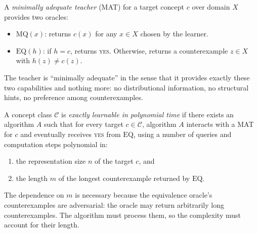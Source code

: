 \begin{defn}
\label{def:mat}
A \emph{minimally adequate teacher} (MAT) for a target concept $c$ over domain $X$ provides two oracles:
\begin{itemize}[leftmargin=*, itemsep=2pt]
\item $\mathrm{MQ}(x)$: returns $c(x)$ for any $x \in X$ chosen by the learner.
\item $\mathrm{EQ}(h)$: if $h = c$, returns \textsc{yes}. Otherwise, returns a counterexample $z \in X$ with $h(z) \neq c(z)$.
\end{itemize}
The teacher is ``minimally adequate'' in the sense that it provides exactly these two capabilities and nothing more: no distributional information, no structural hints, no preference among counterexamples.
\end{defn}

\begin{defn}
\label{def:exact-learning-formal}
A concept class $\mathcal{C}$ is \emph{exactly learnable in polynomial time} if there exists an algorithm $A$ such that for every target $c \in \mathcal{C}$, algorithm $A$ interacts with a MAT for $c$ and eventually receives \textsc{yes} from $\mathrm{EQ}$, using a number of queries and computation steps polynomial in:
\begin{enumerate}[leftmargin=*, nosep]
\item the representation size $n$ of the target $c$, and
\item the length $m$ of the longest counterexample returned by $\mathrm{EQ}$.
\end{enumerate}
\end{defn}

\begin{remark}
\label{rmk:counterexample-length}
The dependence on $m$ is necessary because the equivalence oracle's counterexamples are adversarial: the oracle may return arbitrarily long counterexamples. The algorithm must process them, so the complexity must account for their length.
\end{remark}


